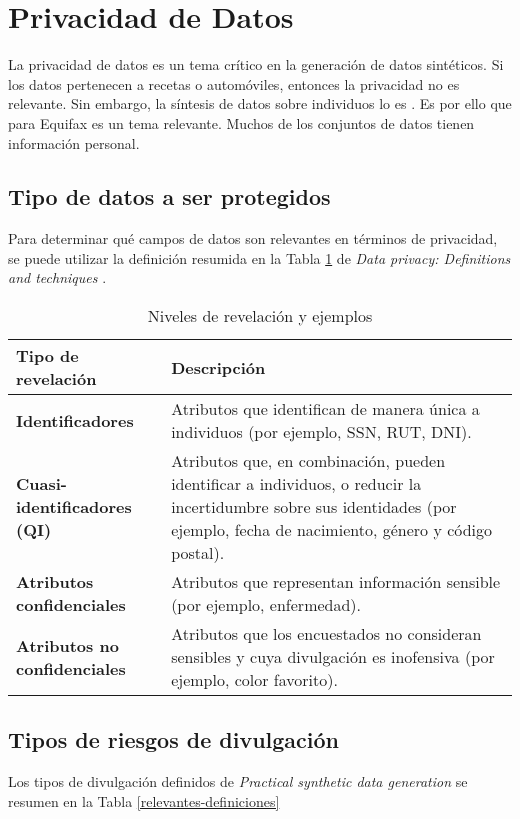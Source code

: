\newpage
\section{Privacidad de Datos}

La privacidad de datos es un tema crítico en la generación de datos sintéticos. Si los datos pertenecen a recetas o automóviles, entonces la privacidad no es relevante. Sin embargo, la síntesis de datos sobre individuos lo es \cite{bruce_practical_2020}. Es por ello que para Equifax es un tema relevante. Muchos de los conjuntos de datos tienen información personal.

\subsection{Tipo de datos a ser protegidos}
Para determinar qué campos de datos son relevantes en términos de privacidad, se puede utilizar la definición resumida en la Tabla \ref{data-relevante} de \emph{Data privacy: Definitions and techniques} \cite{de_capitani_di_vimercati_data_2012}.


\begin{table}[H]
	\centering
	\caption{Niveles de revelación y ejemplos}
	\label{data-relevante}
    \begin{tabular}{|m{15em}|m{25em}|}
    \hline
    \rowcolor[gray]{0.8}
    Tipo de revelación & Descripción \\
    \hline
    \textbf{Identificadores} 
    & Atributos que identifican de manera única a individuos (por ejemplo, SSN, RUT, DNI). \\
    \hline
    \textbf{Cuasi-identificadores (QI)} 
    & Atributos que, en combinación, pueden identificar a individuos, o reducir la incertidumbre sobre sus identidades (por ejemplo, fecha de nacimiento, género y código postal). \\
    \hline
    \textbf{Atributos confidenciales} 
    & Atributos que representan información sensible (por ejemplo, enfermedad). \\
    \hline
    \textbf{Atributos no confidenciales} 
    & Atributos que los encuestados no consideran sensibles y cuya divulgación es inofensiva (por ejemplo, color favorito). \\
    \hline
    \end{tabular}
\end{table}

\newpage
\subsection{Tipos de riesgos de divulgación}
Los tipos de divulgación definidos de \emph{Practical synthetic data generation} \cite{bruce_practical_2020} se resumen en la Tabla \ref{relevantes-definiciones}

